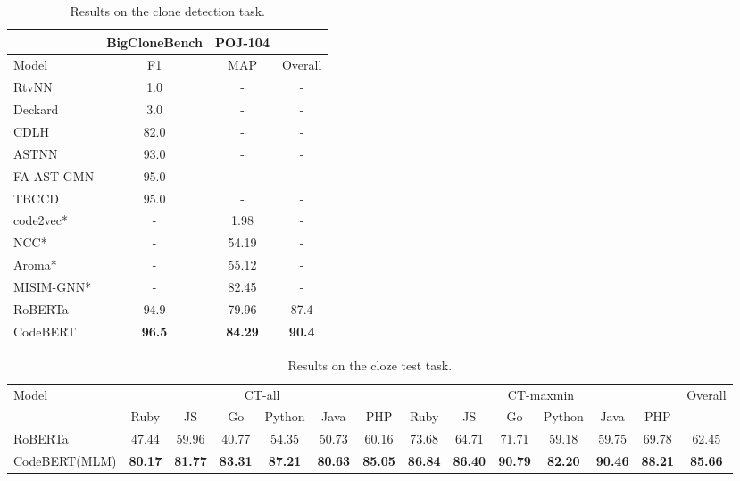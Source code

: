 \documentclass[sigconf,nonacm,screen]{acmart}
\begin{document}
\begin{table}[h]
\centering
\caption{Results on the clone detection task. 
}
\label{table-code-clone-detection}
\begin{tabular}{lccc}
\toprule
    & BigCloneBench & POJ-104& \\
    \midrule 
    Model& F1 & MAP& Overall\\
    \midrule
    RtvNN&1.0&-&- \\
    Deckard&3.0&-&- \\
    CDLH&82.0&-&- \\
    ASTNN &93.0&-&- \\
    FA-AST-GMN&95.0&-&- \\
    TBCCD & 95.0 & - & - \\
    \midrule
    code2vec*&-&1.98&- \\
    NCC*&-&54.19&- \\
    Aroma*&-&55.12&- \\
    MISIM-GNN* &-&82.45&- \\
	\midrule
	RoBERTa& 94.9&79.96&87.4 \\
	CodeBERT& \bf{96.5}&\bf{84.29}&\bf{90.4} \\
	\bottomrule
\end{tabular}
\end{table}


\begin{table*}
\caption{Results on the cloze test task.}
\label{table-clozetest}
\begin{center}
\begin{small}
\begin{tabular}{lcccccc|ccccccc}
\toprule
\multirow{2}{*}{Model} & \multicolumn{6}{c}{CT-all} & \multicolumn{6}{c}{CT-maxmin} & \multirow{2}{*}{Overall} \\
 \cmidrule{2-13}
 & Ruby & JS & Go & Python & Java & PHP & Ruby & JS & Go & Python & Java & PHP & \\
\midrule
 RoBERTa & 47.44 & 59.96 & 40.77 & 54.35 & 50.73 & 60.16 
& 73.68 & 64.71 & 71.71 & 59.18 & 59.75 & 69.78 
         & 62.45\\
 CodeBERT(MLM)  
                & {\bf 80.17} & {\bf 81.77} & \bf{83.31} & {\bf 87.21} & {\bf 80.63} & {\bf 85.05} 
& {\bf 86.84} & {\bf 86.40} & \bf{90.79} & {\bf 82.20} & {\bf 90.46} & {\bf 88.21} 
                & {\bf 85.66}\\

\bottomrule
\end{tabular}
\end{small}
\end{center}
\end{table*}
\end{document}
